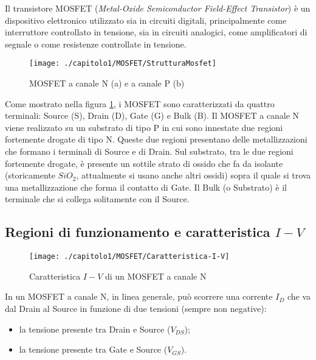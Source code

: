 Il transistore MOSFET (\emph{Metal-Oxide Semiconductor Field-Effect Transistor}) è un dispositivo elettronico utilizzato sia in circuiti digitali, principalmente come interruttore controllato in tensione, sia in circuiti analogici, come amplificatori di segnale o come resistenze controllate in tensione.\\

\begin{figure}[H]
  \centering
  \texttt{[image: ./capitolo1/MOSFET/StrutturaMosfet]}
  \caption[Struttura dei MOSFET]{MOSFET a canale N (a) e a canale P (b)}
  \label{fig:StrutturaMosfet}
\end{figure}

Come mostrato nella figura \ref{fig:StrutturaMosfet}, i MOSFET sono caratterizzati da quattro terminali: Source (S), Drain (D), Gate (G) e Bulk (B).
Il MOSFET a canale N viene realizzato su un substrato di tipo P in cui sono innestate due regioni fortemente drogate di tipo N. Queste due regioni presentano delle metallizzazioni che formano i terminali di Source e di Drain. Sul substrato, tra le due regioni fortemente drogate, è presente un sottile strato di ossido che fa da isolante (storicamente $SiO_2$, attualmente si usano anche altri ossidi) sopra il quale si trova una metallizzazione che forma il contatto di Gate. Il Bulk (o Substrato) è il terminale che si collega solitamente con il Source.\\

\subsection{Regioni di funzionamento e caratteristica $I-V$}

\begin{figure}[H]
  \centering
  \texttt{[image: ./capitolo1/MOSFET/Caratteristica-I-V]}
  \caption[Caratteristica $I-V$ di un MOSFET a canale N]{Caratteristica $I-V$ di un MOSFET a canale N}
  \label{fig:caratteristica-I-V}
\end{figure}

In un MOSFET a canale N, in linea generale, può scorrere una corrente $I_D$ che va dal Drain al Source in funzione di due tensioni (sempre non negative): 
\begin{itemize}
  \item la tensione presente tra Drain e Source ($V_{DS}$);
  \item la tensione presente tra Gate e Source ($V_{GS}$).  
\end{itemize}

